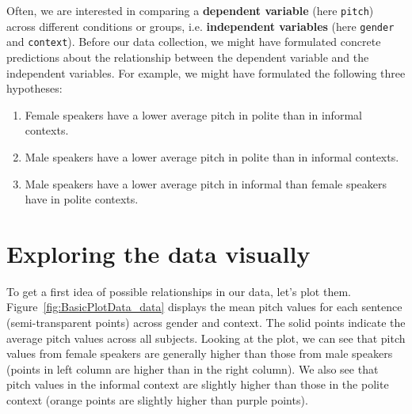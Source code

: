 \documentclass[nobib]{tufte-handout}
\begin{document}
Often, we are interested in comparing a \textbf{dependent variable} (here \texttt{pitch})
across different conditions or groups, i.e. \textbf{independent variables} (here \texttt{gender} and \texttt{context}). Before our data collection,
we might have formulated concrete predictions about the relationship between the dependent
variable and the independent variables. For example, we might have formulated the following three
hypotheses:

\begin{enumerate}[{H}1:]
\item Female speakers have a lower average pitch in polite than in informal contexts.
\item Male speakers have a lower average pitch in polite than in informal contexts.
\item Male speakers have a lower average pitch in informal than female speakers have in polite contexts.
\end{enumerate}

\section{Exploring the data visually}

To get a first idea of possible relationships in our data, let's plot
them. Figure~\ref{fig:BasicPlotData_data} displays the mean pitch values for each
sentence (semi-transparent points) across gender and context. The solid points indicate the
average pitch values across all subjects. Looking at the plot, we can see that pitch values
from female speakers are generally higher than those from male speakers (points in left column
are higher than in the right column). We also see that pitch values in the informal context are slightly higher than those in the polite context  (orange points are
slightly higher than purple points).
\end{document}
